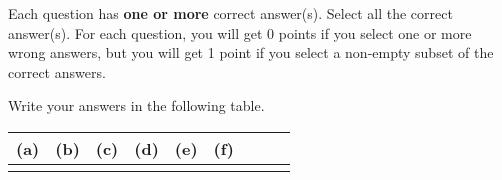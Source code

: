 
Each question has \textbf{one or more} correct answer(s). Select all the correct answer(s). For each question, you will get 0 points if you select one or more wrong answers, but you will get 1 point if you select a non-empty subset of the correct answers.

Write your answers in the following table.


\begin{table}[htbp]
	\centering
	\begin{tabular}{|p{1.7cm}|p{1.7cm}|p{1.7cm}|p{1.7cm}|p{1.7cm}|p{1.7cm}|p{1.7cm}|p{1.7cm}|p{1.7cm}|}
		\hline
		(a) & (b) & (c) & (d) & (e) & (f) \\
		\hline
		   &  &  &    &  &  \\
		\hline
	\end{tabular}
\end{table}

